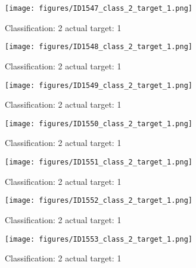 \begin{figure}[h!]
\begin{center}
\texttt{[image: figures/ID1547\_class\_2\_target\_1.png]}
\end{center}
\caption{ Classification: 2 actual target: 1}
\label{fig:ID1547_class_2_target_1}
\end{figure}
\begin{figure}[h!]
\begin{center}
\texttt{[image: figures/ID1548\_class\_2\_target\_1.png]}
\end{center}
\caption{ Classification: 2 actual target: 1}
\label{fig:ID1548_class_2_target_1}
\end{figure}
\begin{figure}[h!]
\begin{center}
\texttt{[image: figures/ID1549\_class\_2\_target\_1.png]}
\end{center}
\caption{ Classification: 2 actual target: 1}
\label{fig:ID1549_class_2_target_1}
\end{figure}
\begin{figure}[h!]
\begin{center}
\texttt{[image: figures/ID1550\_class\_2\_target\_1.png]}
\end{center}
\caption{ Classification: 2 actual target: 1}
\label{fig:ID1550_class_2_target_1}
\end{figure}
\begin{figure}[h!]
\begin{center}
\texttt{[image: figures/ID1551\_class\_2\_target\_1.png]}
\end{center}
\caption{ Classification: 2 actual target: 1}
\label{fig:ID1551_class_2_target_1}
\end{figure}
\begin{figure}[h!]
\begin{center}
\texttt{[image: figures/ID1552\_class\_2\_target\_1.png]}
\end{center}
\caption{ Classification: 2 actual target: 1}
\label{fig:ID1552_class_2_target_1}
\end{figure}
\begin{figure}[h!]
\begin{center}
\texttt{[image: figures/ID1553\_class\_2\_target\_1.png]}
\end{center}
\caption{ Classification: 2 actual target: 1}
\label{fig:ID1553_class_2_target_1}
\end{figure}
